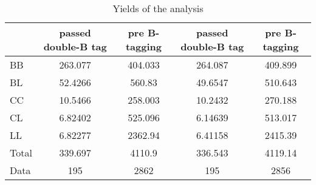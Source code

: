 \documentclass[10pt]{article}
\begin{document}
\begin{table}[htbp]
\begin{center}
\begin{tabular}{|l|S|S|S|S|}
\hline 
 & {passed double-B tag} & {pre B-tagging} & {passed double-B tag} & {pre B-tagging}\\
\hline 
  BB   & 263.077  & 404.033  & 264.087  & 409.899  \\ 
  BL   & 52.4266  & 560.83  & 49.6547  & 510.643  \\ 
  CC   & 10.5466  & 258.003  & 10.2432  & 270.188  \\ 
  CL   & 6.82402  & 525.096  & 6.14639  & 513.017  \\ 
  LL   & 6.82277  & 2362.94  & 6.41158  & 2415.39  \\ 
\hline 
  Total  & 339.697  & 4110.9  & 336.543  & 4119.14  \\ 
\hline 
  Data   & 195 & 2862 & 195 & 2856 \\ 
\hline 
\end{tabular} 
\caption{Yields of the analysis} 
\end{center} 
\end{table} 
\end{document}
